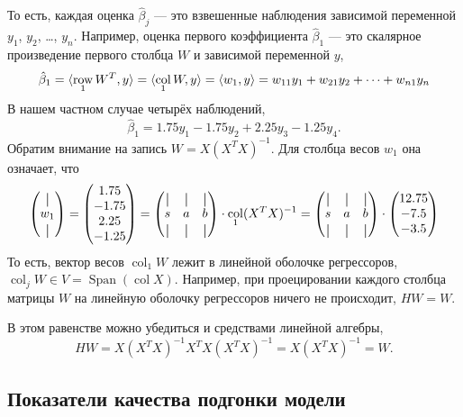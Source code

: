 \documentclass[12pt]{article}
\DeclareMathOperator{\col}{col}
\DeclareMathOperator{\row}{row}
\DeclareMathOperator{\Span}{Span}
\DeclarePairedDelimiter{\scalp}{\langle}{\rangle}
\newcommand*{\vertbar}{\rule[-1ex]{0.5pt}{2.5ex}}
\newcommand{\hb}{\hat{\beta}}
\begin{document}
То есть, каждая оценка $\hb_j$ — это взвешенные наблюдения зависимой переменной $y_1$, $y_2$, \dots, $y_n$.
Например, оценка первого коэффициента $\hb_1$ — это скалярное произведение первого столбца $W$ и зависимой переменной $y$,
\[
\hb_1 = \scalp{\row_1 W^T, y} = \scalp{\col_1 W, y} = \scalp{w_1, y}  = w_{11}y_1 + w_{21} y_2 + \dots + w_{n1} y_n 
\]
В нашем частном случае четырёх наблюдений,
\[
\hb_1 = 1.75 y_1 - 1.75 y_2 + 2.25y_3 - 1.25 y_4.
\]
Обратим внимание на запись $W = X(X^TX)^{-1}$.
Для столбца весов $w_1$ она означает, что
\[
\begin{pmatrix}
    \vertbar \\
    w_1 \\
    \vertbar
\end{pmatrix} =
\begin{pmatrix}
    1.75 \\
    -1.75 \\
    2.25 \\
    -1.25
\end{pmatrix} =
\begin{pmatrix}
    \vertbar & \vertbar & \vertbar \\
    s & a & b \\
    \vertbar & \vertbar & \vertbar \\    
\end{pmatrix} \cdot \col_1 (X^TX)^{-1} = 
\begin{pmatrix}
    \vertbar & \vertbar & \vertbar \\
    s & a & b \\
    \vertbar & \vertbar & \vertbar \\    
\end{pmatrix} \cdot \begin{pmatrix}
    12.75 \\
    -7.5 \\
    -3.5 \\
\end{pmatrix}
\]
То есть, вектор весов $\col_1 W$ лежит в линейной оболочке регрессоров, $\col_j W \in V = \Span(\col X)$.
Например, при проецировании каждого столбца матрицы $W$ на линейную оболочку регрессоров ничего не происходит, $HW = W$.

В этом равенстве можно убедиться и средствами линейной алгебры,
\[
HW = X(X^TX)^{-1} X^T X(X^TX)^{-1} = X(X^TX)^{-1} = W.
\]


\subsection{Показатели качества подгонки модели}
\end{document}
